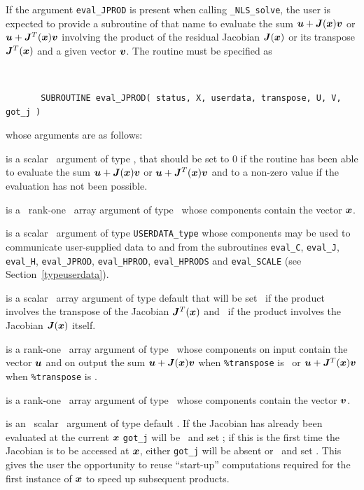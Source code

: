 \documentclass{galahad}
\newcommand{\packagename}{NLS}
\newcommand{\fullpackagename}{\libraryname\_\packagename}
\newcommand{\solver}{{\tt \fullpackagename\_solve}}
\begin{document}
If the argument {\tt eval\_JPROD} is present when calling \solver, the
user is expected to provide a subroutine of that name to evaluate the
sum ${\bm{u}} + {\bm{J}}({\bm{x}}) {\bm{v}}$ or ${\bm{u}} + {\bm{J}}^T({\bm{x}}){\bm{v}}$ involving the
product of the residual Jacobian ${\bm{J}}({\bm{x}})$ or its transpose ${\bm{J}}^T({\bm{x}})$
and a given vector ${\bm{v}}$.
The routine must be specified as

\def\baselinestretch{0.8}
{\tt
\begin{verbatim}
       SUBROUTINE eval_JPROD( status, X, userdata, transpose, U, V, got_j )
\end{verbatim} }
\def\baselinestretch{1.0}
\noindent whose arguments are as follows:

\begin{description}
 is a scalar \intentout\ argument of type \integer,
that should be set to 0 if the routine has been able to evaluate the
sum ${\bm{u}} + {\bm{J}}({\bm{x}}) {\bm{v}}$ or ${\bm{u}} + {\bm{J}}^T({\bm{x}}){\bm{v}}$
and to a non-zero value if the evaluation has not been possible.

 is a \ rank-one \intentin\ array argument of type
\realdp\ whose components contain the vector ${\bm{x}}$.

 is a scalar \intentinout\ argument of type
{\tt USERDATA\_type} whose components may be used
to communicate user-supplied data to and from the subroutines
{\tt eval\_C}, {\tt eval\_J}, {\tt eval\_H}, {\tt eval\_JPROD},
{\tt eval\_HPROD}, {\tt eval\_HPRODS} and {\tt eval\_SCALE}
(see Section~\ref{typeuserdata}).

 is a scalar \intentin\ array argument of type
default that will be set \true\ if the product involves the transpose
of the Jacobian ${\bm{J}}^T({\bm{x}})$ and \false\ if the product involves
the Jacobian ${\bm{J}}({\bm{x}})$ itself.

 is a rank-one \intentinout\ array argument of type \realdp\
whose components on input contain the vector ${\bm{u}}$ and on output the
sum ${\bm{u}} + {\bm{J}}({\bm{x}}) {\bm{v}}$ when {\tt \%transpose} is \false\ or
${\bm{u}} + {\bm{J}}^T({\bm{x}}) {\bm{v}}$ when {\tt \%transpose} is \true.

 is a rank-one \intentin\ array argument of type \realdp\
whose components contain the vector ${\bm{v}}$.

 is an \optional\ scalar \intentin\ argument of type default
\logical. If the Jacobian has already been evaluated at the current ${\bm{x}}$
{\tt got\_j} will be \present\ and set \true; if this is the first time
the Jacobian is to be accessed at ${\bm{x}}$, either {\tt got\_j} will be absent
or \present\ and set \false. This gives the user the opportunity
to reuse ``start-up'' computations required for the first instance of
${\bm{x}}$ to speed up subsequent products.

\end{description}
\end{document}
